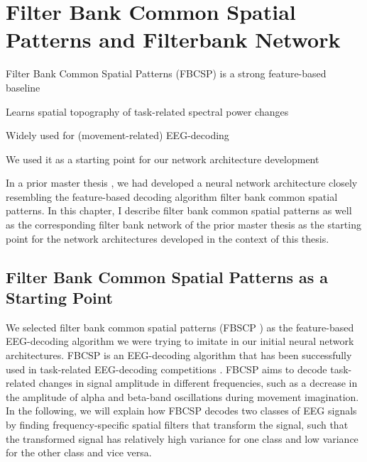 \chapter{Filter Bank Common Spatial Patterns and
Filterbank Network}\label{fbscp-and-filterbank-net}

\begin{startbox}{Filter Bank Common Spatial Patterns (FBCSP) is a strong feature-based baseline}
\item Learns spatial topography of task-related spectral power changes
\item Widely used for (movement-related) EEG-decoding
\item We used it as a starting point for our network architecture development
\end{startbox}



    In a prior master thesis
\citep{schirrmeister_msc_thesis_2015}, we had developed a
neural network architecture closely resembling the feature-based
decoding algorithm filter bank common spatial patterns. In this chapter,
I describe filter bank common spatial patterns as well as the
corresponding filter bank network of the prior master thesis as the
starting point for the network architectures developed in the context of
this thesis.

\section{Filter Bank Common Spatial Patterns as a Starting
Point}\label{filter-bank-common-spatial-patterns-as-a-starting-point}


We selected filter bank common spatial patterns (FBSCP
\cite{ang_filter_2008,chin_multi-class_2009}) as the
feature-based EEG-decoding algorithm we were trying to imitate in our
initial neural network architectures. FBCSP is an EEG-decoding algorithm
that has been successfully used in task-related EEG-decoding
competitions \cite{tangermann_review_2012}. FBCSP aims to
decode task-related changes in signal amplitude in different
frequencies, such as a decrease in the amplitude of alpha and beta-band
oscillations during movement imagination. In the following, we will
explain how FBCSP decodes two classes of EEG signals by finding
frequency-specific spatial filters that transform the signal, such that
the transformed signal has relatively high variance for one class and low variance for the
other class and vice versa.


